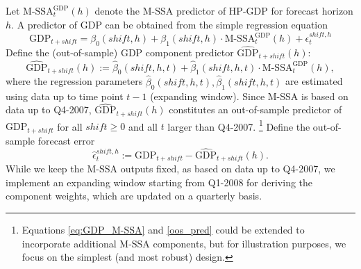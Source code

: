 \documentclass[11pt,a4paper]{article}
\begin{document}
Let $\textrm{M-SSA}^{\textrm{GDP}}_t(h)$ denote the M-SSA predictor of HP-GDP for forecast horizon $h$. A predictor of GDP can be obtained from the simple regression equation
\begin{equation}
\textrm{GDP}_{t+shift}=\beta_0(shift,h)+\beta_1(shift,h) \cdot \textrm{M-SSA}^{\textrm{GDP}}_t(h) + \epsilon_t^{shift,h}
\label{eq:GDP_M-SSA}
\end{equation}
Define the (out-of-sample) GDP component predictor $\hat{\textrm{GDP}}_{t+shift}(h)$:  
\begin{equation}\label{oos_pred}
\hat{\textrm{GDP}}_{t+shift}(h):=\hat{\beta}_0(shift,h,t)+\hat{\beta}_1(shift,h,t) \cdot \textrm{M-SSA}^{\textrm{GDP}}_t(h),
\end{equation}
where the regression parameters $\hat{\beta}_0(shift,h,t),\hat{\beta}_1(shift,h,t)$ are estimated using data up to time point $t-1$ (expanding window). Since M-SSA is based on data up to Q4-2007, $\hat{\textrm{GDP}}_{t+shift}(h)$ constitutes an out-of-sample predictor of $\textrm{GDP}_{t+shift}$ for all $shift\geq 0$ and all $t$ larger than Q4-2007. 
\footnote{Equations \eqref{eq:GDP_M-SSA} and \eqref{oos_pred} could be extended to incorporate additional M-SSA components, but for illustration purposes, we focus on the simplest (and most robust) design.}
Define the out-of-sample forecast error
\begin{equation}\label{oosfe}
\hat{\epsilon}_t^{shift,h}:={\textrm{GDP}}_{t+shift}-\hat{\textrm{GDP}}_{t+shift}(h).
\end{equation}
While we keep the M-SSA outputs fixed, as based on data up to Q4-2007, we implement an expanding window starting from Q1-2008 for deriving the component weights, which are updated on a quarterly basis. 
\end{document}
